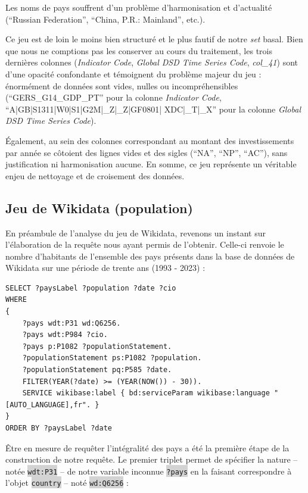 \documentclass[hidelinks, 12pt]{report}
\newcommand{\code}[1]{\colorbox{LightGray}{\texttt{#1}}}
\begin{document}
Les noms de pays souffrent d'un problème d'harmonisation et d'actualité (\enquote{Russian Federation}, \enquote{China, P.R.: Mainland}, etc.).

Ce jeu est de loin le moins bien structuré et le plus fautif de notre \textit{set} basal. Bien que nous ne comptions pas les conserver au cours du traitement, les trois dernières colonnes (\textit{Indicator Code}, \textit{Global DSD Time Series Code}, \textit{col\_41}) sont d'une opacité confondante et témoignent du problème majeur du jeu : énormément de données sont vides, nulles ou incompréhensibles (\enquote{GERS\_G14\_GDP\_PT} pour la colonne \textit{Indicator Code}, \enquote{A|GB|S1311|W0|S1|G2M|\_Z|\_Z|GF0801|
	XDC|\_T|\_X} pour la colonne \textit{Global DSD Time Series Code}).

Également, au sein des colonnes correspondant au montant des investissements par année se côtoient des lignes vides et des sigles (\enquote{NA}, \enquote{NP}, \enquote{AC}), sans justification ni harmonisation aucune. En somme, ce jeu représente un véritable enjeu de nettoyage et de croisement des données.





%





\subsection{Jeu de Wikidata (population)}

En préambule de l'analyse du jeu de Wikidata, revenons un instant sur l'élaboration de la requête nous ayant permis de l'obtenir. Celle-ci renvoie le nombre d'habitants de l'ensemble des pays présents dans la base de données de Wikidata sur une période de trente ans (1993 - 2023) :

\label{query1}\begin{lstlisting}[language=SPARQL]
SELECT ?paysLabel ?population ?date ?cio
WHERE 
{
	?pays wdt:P31 wd:Q6256.
	?pays wdt:P984 ?cio.
	?pays p:P1082 ?populationStatement.
	?populationStatement ps:P1082 ?population. 
	?populationStatement pq:P585 ?date.
	FILTER(YEAR(?date) >= (YEAR(NOW()) - 30)).
	SERVICE wikibase:label { bd:serviceParam wikibase:language "[AUTO_LANGUAGE],fr". }
}
ORDER BY ?paysLabel ?date
\end{lstlisting}

Être en mesure de requêter l'intégralité des pays a été la première étape de la construction de notre requête. Le premier triplet permet de spécifier la nature -- notée \code{wdt:P31} -- de notre variable inconnue \code{?pays} en la faisant correspondre à l'objet \code{country} -- noté \code{wd:Q6256} :
\end{document}
